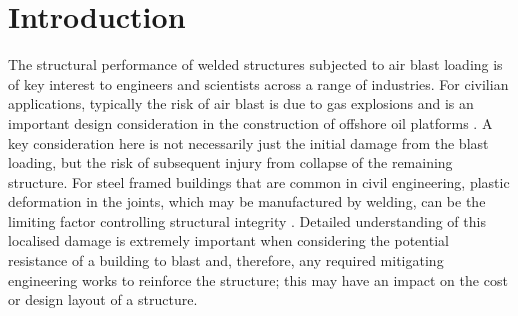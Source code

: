 \section{Introduction}
\label{Intro}
%
The structural performance of welded structures subjected to air blast loading is of key interest to engineers and scientists across a range of industries. For civilian applications, typically the risk of air blast is due to gas explosions and is an important design consideration in the construction of offshore oil platforms \cite{Langdon2005,Langdon2005a,Langdon2006}. %
A key consideration here is not necessarily just the initial damage from the blast loading, but the risk of subsequent injury from collapse of the remaining structure. For steel framed buildings that are common in civil engineering, plastic deformation in the joints, which may be manufactured by welding, can be the limiting factor controlling structural integrity \cite{Ngo2007}. Detailed understanding of this localised damage is extremely important when considering the potential resistance of a building to blast and, therefore, any required mitigating engineering works to reinforce the structure; this may have an impact on the cost or design layout of a structure.


